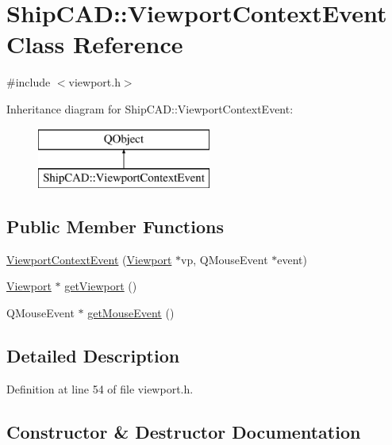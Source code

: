\hypertarget{classShipCAD_1_1ViewportContextEvent}{}\section{Ship\+C\+AD\+:\+:Viewport\+Context\+Event Class Reference}
\label{classShipCAD_1_1ViewportContextEvent}


{\ttfamily \#include $<$viewport.\+h$>$}

Inheritance diagram for Ship\+C\+AD\+:\+:Viewport\+Context\+Event\+:\begin{figure}[H]
\begin{center}
\leavevmode
\includegraphics[height=2.000000cm]{classShipCAD_1_1ViewportContextEvent}
\end{center}
\end{figure}
\subsection*{Public Member Functions}
\begin{DoxyCompactItemize}
\item 
\hyperlink{classShipCAD_1_1ViewportContextEvent_a650e08d01b91eecaae90b3cd107ae46b}{Viewport\+Context\+Event} (\hyperlink{classShipCAD_1_1Viewport}{Viewport} $\ast$vp, Q\+Mouse\+Event $\ast$event)
\item 
\hyperlink{classShipCAD_1_1Viewport}{Viewport} $\ast$ \hyperlink{classShipCAD_1_1ViewportContextEvent_a1691135d434388eab7650f76dfb8c8f5}{get\+Viewport} ()
\item 
Q\+Mouse\+Event $\ast$ \hyperlink{classShipCAD_1_1ViewportContextEvent_aa0a673e4b6d86bf0235791827c29749e}{get\+Mouse\+Event} ()
\end{DoxyCompactItemize}


\subsection{Detailed Description}


Definition at line 54 of file viewport.\+h.



\subsection{Constructor \& Destructor Documentation}
